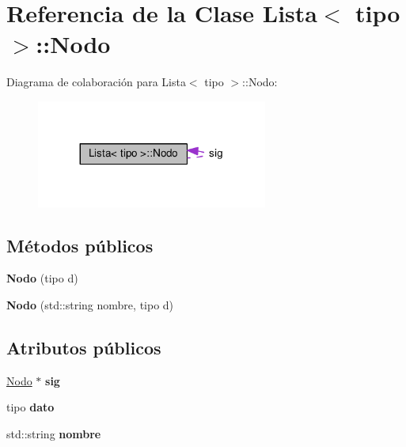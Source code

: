 \hypertarget{classLista_1_1Nodo}{}\section{Referencia de la Clase Lista$<$ tipo $>$\+:\+:Nodo}
\label{classLista_1_1Nodo}


Diagrama de colaboración para Lista$<$ tipo $>$\+:\+:Nodo\+:\nopagebreak
\begin{figure}[H]
\begin{center}
\leavevmode
\includegraphics[width=215pt]{classLista_1_1Nodo__coll__graph}
\end{center}
\end{figure}
\subsection*{Métodos públicos}
\begin{DoxyCompactItemize}
\item 
\mbox{\label{classLista_1_1Nodo_a76d93da356c9904873c409f413737e58}} 
{\bfseries Nodo} (tipo d)
\item 
\mbox{\label{classLista_1_1Nodo_a0ab9f1e824afe00a532fabf20ffc2607}} 
{\bfseries Nodo} (std\+::string nombre, tipo d)
\end{DoxyCompactItemize}
\subsection*{Atributos públicos}
\begin{DoxyCompactItemize}
\item 
\mbox{\label{classLista_1_1Nodo_a8594ea833e1be652cb7a9b8be66bf97d}} 
\hyperlink{classLista_1_1Nodo}{Nodo} $\ast$ {\bfseries sig}
\item 
\mbox{\label{classLista_1_1Nodo_ae3e8f0073984b0791ba94590ea9e2c9f}} 
tipo {\bfseries dato}
\item 
\mbox{\label{classLista_1_1Nodo_ab6ad6f5015b5e8acd5f82ca3701eb804}} 
std\+::string {\bfseries nombre}
\end{DoxyCompactItemize}


